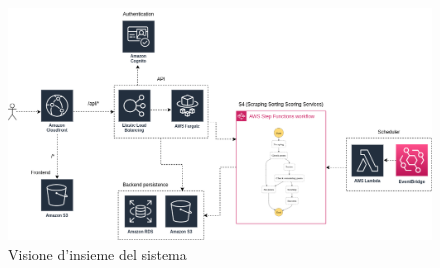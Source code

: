 \begin{figure}[!h]
    \includegraphics[width=16cm]{sezioni/images/overview.png}
    \centering
    \caption{Visione d'insieme del sistema}
\end{figure}

